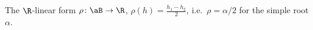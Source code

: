The $\R$-linear form $\rho\colon\aB\to\R$, $\rho(h)=\tfrac{h_1-h_2}2$, i.e.\ $\rho=\alpha/2$ for the simple root $\alpha$.
